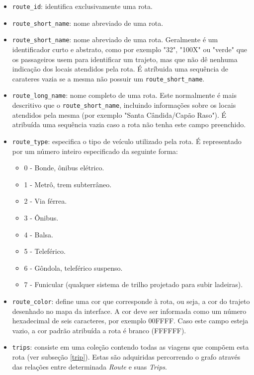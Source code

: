 \begin{itemize}
	\item \texttt{route\_id}: identifica exclusivamente uma rota.
	\item \texttt{route\_short\_name}: nome abreviado de uma rota.
	\item \texttt{route\_short\_name}: nome abreviado de uma rota.
	Geralmente é um identificador curto e abstrato, como por exemplo "32", "100X" ou "verde" que os passageiros usem para identificar um trajeto, mas que não dê 			nenhuma indicação dos locais atendidos pela rota. 
	É atríbuida uma sequência de carateres vazia se a mesma não possuir um \texttt{route\_short\_name}.
	\item \texttt{route\_long\_name}:  nome completo de uma rota. 
	Este normalmente é mais descritivo que o \texttt{route\_short\_name}, incluindo informações sobre os locais atendidos pela mesma (por exemplo "Santa Cândida/Capão 	Raso"). 
	É atribuída uma sequência vazia caso a rota não tenha este campo preenchido.
	\item \texttt{route\_type}: especifica o tipo de veículo utilizado pela rota. É representado por um número inteiro especificado da seguinte forma:
		\begin{itemize}
			\item 0 - Bonde, ônibus elétrico.
			\item 1 - Metrô, trem subterrâneo.
			\item 2 - Via férrea.
			\item 3 - Ônibus.
			\item 4 - Balsa.
			\item 5 - Teleférico.
			\item 6 - Gôndola, teleférico suspenso.
			\item 7 - Funicular (qualquer sistema de trilho projetado para subir ladeiras).
		\end{itemize}
	\item \texttt{route\_color}: define uma cor que corresponde à rota, ou seja, a cor do trajeto desenhado no mapa da interface. A cor deve ser informada como um 			número hexadecimal de seis caracteres, por exemplo 00FFFF. 
	Caso este campo esteja vazio, a cor padrão atribuída a rota é branco (FFFFFF).
	\item \texttt{trips}: consiste em uma coleção contendo todas as viagens que compõem esta rota (ver subseção \ref{trip}).
	Estas são adquiridas percorrendo o grafo através das relações entre determinada \emph{Route} e suas \emph{Trips}.
\end{itemize}

